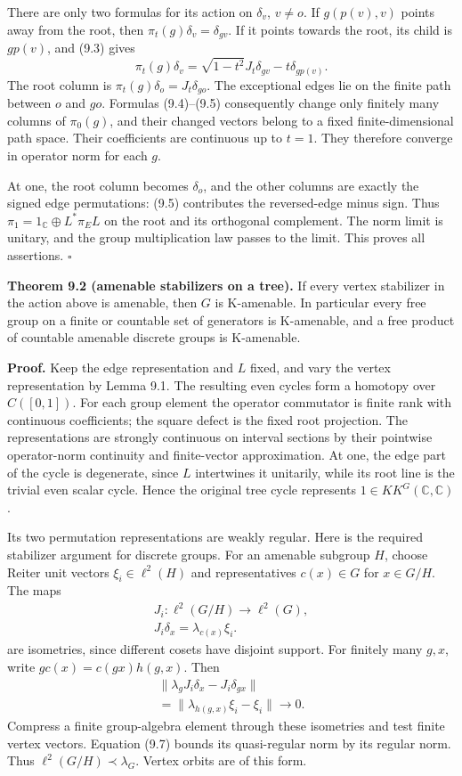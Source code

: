 \documentclass[
  11pt,
]{article}
\begin{document}
There are only two formulas for its action on \(\delta_v\), \(v\ne o\).
If \(g(p(v),v)\) points away from the root, then
\(\pi_t(g)\delta_v=\delta_{gv}\). If it points towards the root, its
child is \(gp(v)\), and (9.3) gives \[
\pi_t(g)\delta_v
 =\sqrt{1-t^2}J_t\delta_{gv}-t\delta_{gp(v)}.
\tag{9.5}
\] The root column is \(\pi_t(g)\delta_o=J_t\delta_{go}\). The
exceptional edges lie on the finite path between \(o\) and \(go\).
Formulas (9.4)--(9.5) consequently change only finitely many columns of
\(\pi_0(g)\), and their changed vectors belong to a fixed
finite-dimensional path space. Their coefficients are continuous up to
\(t=1\). They therefore converge in operator norm for each \(g\).

At one, the root column becomes \(\delta_o\), and the other columns are
exactly the signed edge permutations: (9.5) contributes the
reversed-edge minus sign. Thus \(\pi_1=1_{\mathbb C}\oplus L^*\pi_E L\)
on the root and its orthogonal complement. The norm limit is unitary,
and the group multiplication law passes to the limit. This proves all
assertions. \(\square\)

\textbf{Theorem 9.2 (amenable stabilizers on a tree).} If every vertex
stabilizer in the action above is amenable, then \(G\) is K-amenable. In
particular every free group on a finite or countable set of generators
is K-amenable, and a free product of countable amenable discrete groups
is K-amenable.

\textbf{Proof.} Keep the edge representation and \(L\) fixed, and vary
the vertex representation by Lemma 9.1. The resulting even cycles form a
homotopy over \(C([0,1])\). For each group element the operator
commutator is finite rank with continuous coefficients; the square
defect is the fixed root projection. The representations are strongly
continuous on interval sections by their pointwise operator-norm
continuity and finite-vector approximation. At one, the edge part of the
cycle is degenerate, since \(L\) intertwines it unitarily, while its
root line is the trivial even scalar cycle. Hence the original tree
cycle represents \(1\in KK^G(\mathbb C,\mathbb C)\).

Its two permutation representations are weakly regular. Here is the
required stabilizer argument for discrete groups. For an amenable
subgroup \(H\), choose Reiter unit vectors \(\xi_i\in\ell^2(H)\) and
representatives \(c(x)\in G\) for \(x\in G/H\). The maps \[
\begin{gathered}
J_i:\ell^2(G/H)\longrightarrow\ell^2(G),\\
J_i\delta_x=\lambda_{c(x)}\xi_i.
\end{gathered}
\tag{9.6}
\] are isometries, since different cosets have disjoint support. For
finitely many \(g,x\), write \(gc(x)=c(gx)h(g,x)\). Then \[
\begin{gathered}
\|\lambda_gJ_i\delta_x-J_i\delta_{gx}\|\\
 =\|\lambda_{h(g,x)}\xi_i-\xi_i\|\longrightarrow0.
\end{gathered}
\tag{9.7}
\] Compress a finite group-algebra element through these isometries and
test finite vertex vectors. Equation (9.7) bounds its quasi-regular norm
by its regular norm. Thus \(\ell^2(G/H)\prec\lambda_G\). Vertex orbits
are of this form.
\end{document}
